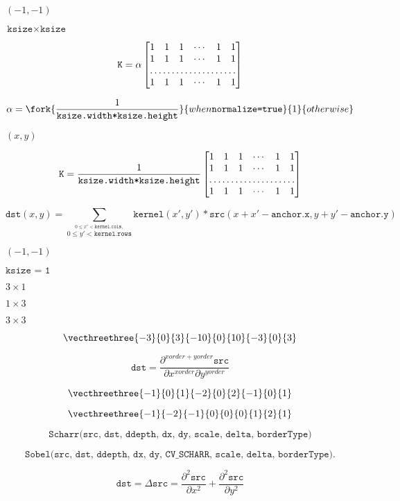 \documentclass{article}
\begin{document}
$(-1, -1)$
\pagebreak

$\texttt{ksize} \times \texttt{ksize}$
\pagebreak

\[\texttt{K} = \alpha \begin{bmatrix} 1 & 1 & 1 & \cdots & 1 & 1 \\ 1 & 1 & 1 & \cdots & 1 & 1 \\ \hdotsfor{6} \\ 1 & 1 & 1 & \cdots & 1 & 1 \end{bmatrix}\]
\pagebreak

\[\alpha = \fork{\frac{1}{\texttt{ksize.width*ksize.height}}}{when \texttt{normalize=true}}{1}{otherwise}\]
\pagebreak

$ (x, y) $
\pagebreak

\[\texttt{K} = \frac{1}{\texttt{ksize.width*ksize.height}} \begin{bmatrix} 1 & 1 & 1 & \cdots & 1 & 1 \\ 1 & 1 & 1 & \cdots & 1 & 1 \\ \hdotsfor{6} \\ 1 & 1 & 1 & \cdots & 1 & 1 \\ \end{bmatrix}\]
\pagebreak

\[\texttt{dst} (x,y) = \sum _{ \stackrel{0\leq x' < \texttt{kernel.cols},}{0\leq y' < \texttt{kernel.rows}} } \texttt{kernel} (x',y')* \texttt{src} (x+x'- \texttt{anchor.x} ,y+y'- \texttt{anchor.y} )\]
\pagebreak

$(-1,-1)$
\pagebreak

$\texttt{ksize = 1}$
\pagebreak

$3 \times 1$
\pagebreak

$1 \times 3$
\pagebreak

$3\times3$
\pagebreak

\[\vecthreethree{-3}{0}{3}{-10}{0}{10}{-3}{0}{3}\]
\pagebreak

\[\texttt{dst} = \frac{\partial^{xorder+yorder} \texttt{src}}{\partial x^{xorder} \partial y^{yorder}}\]
\pagebreak

\[\vecthreethree{-1}{0}{1}{-2}{0}{2}{-1}{0}{1}\]
\pagebreak

\[\vecthreethree{-1}{-2}{-1}{0}{0}{0}{1}{2}{1}\]
\pagebreak

\[\texttt{Scharr(src, dst, ddepth, dx, dy, scale, delta, borderType)}\]
\pagebreak

\[\texttt{Sobel(src, dst, ddepth, dx, dy, CV_SCHARR, scale, delta, borderType)} .\]
\pagebreak

\[\texttt{dst} = \Delta \texttt{src} = \frac{\partial^2 \texttt{src}}{\partial x^2} + \frac{\partial^2 \texttt{src}}{\partial y^2}\]
\pagebreak
\end{document}
